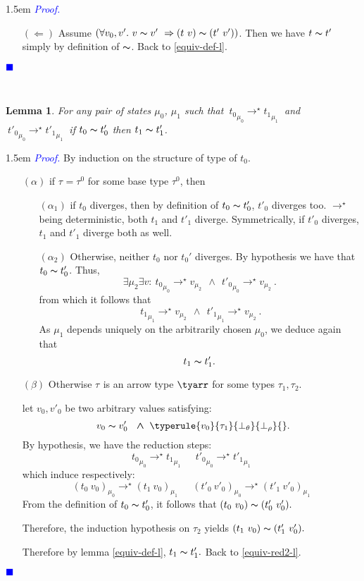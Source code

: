 \documentclass[a4paper,11pt,oneside]{article}
\theoremstyle{plain}
\newtheorem{lemma}[definition]{Lemma}
\renewenvironment{proof}{\noindent \begin{adjustwidth}{1.5em}{} \textcolor{blue}{\textit{Proof.}}}
{{\begin{tiny}\textcolor{blue}{$\blacksquare$}\end{tiny}}
\end{adjustwidth}~\\\noindent}
\newcommand{\tmapp}[2]{(#1 ~ #2)}
\newcommand{\ty}[1][]{\tau_{#1}}
\newcommand{\bwedge}{\boldsymbol{~\wedge~}}
\newcommand{\bth}{\bot_\theta}
\newcommand{\brh}{\bot_\rho}
\newcommand{\evalstar}[4]{~#1_{\mu_#2} \rightarrow^{\star} #3_{\mu_#4} ~}
\newcommand{\eqv}[1]{#1 \thicksim #1'}
\begin{document}
\begin{proof}
\begin{itemize}
	
		\item[$(\Leftarrow)$] Assume $(\forall v_0, v'.~\eqv{v}~\Rightarrow
		\tmapp{t}{v} \thicksim \tmapp{t'}{v'})$. 
		Then we have $\eqv{t}$ simply by definition of $\thicksim$. Back to \ref{equiv-def-l}.
				
		\end{itemize}	
	\end{proof}

	\begin{lemma}
		For any pair of states $\mu_0$, $\mu_1$ such that
		$\evalstar{{t_0}}{0}{{t_1}}{1}$ and $\evalstar{{t'_0}}{0}{{t'_1}}{1}$
		if $\eqv{t_0}$ then $\eqv{t_1}$.
		\label{equiv-red2-p}
	\end{lemma}
	
	\begin{proof}
		By induction on the structure of type of $t_0$. 
		\begin{itemize}
		\item[$(\alpha)$] if $\ty = \ty^0$ for some base type $\ty^0$, then
		
			\begin{itemize}
			\item[$(\alpha_1)$] if $t_0$ diverges, then by definition of 
			$\eqv{t_0}$, $t'_0$ diverges too. $\rightarrow^\star$ being 
			deterministic, both $t_1$ and $t'_1$ diverge. Symmetrically, if 
			$t'_0$ diverges, $t_1$ and $t'_1$ diverge both as well. 
						
			\item[$(\alpha_2)$] Otherwise, neither $t_0$ nor $t_{0}'$ diverges. 
			 By hypothesis we have that $\eqv{t_0}$. Thus,  
					$$ \exists \mu_2 \exists v: 
					\evalstar{{t_0}}{0}{v}{2} \bwedge \evalstar{{t'_0}}{0}{v}{2}.$$
				from which it follows that 
					$$\evalstar{{t_1}}{1}{v}{2} \bwedge \evalstar{{t'_1}}{1}{v}{2}.$$
				As $\mu_1$ depends uniquely on the arbitrarily chosen 
				$\mu_0$, we deduce again that $$\eqv{t_1}.$$					
			\end{itemize}			
			
		\item[$(\beta)$] Otherwise $\ty$ is an arrow type $\tyarr$ for some types 
		$\ty[1], \ty[2]$.	
		
		let $v_0, v'_0$ be two arbitrary values satisfying:
		$$~\eqv{v_0}~\bwedge \typerule{v_0}{\ty[1]}{\bth}{\brh}{}.$$
		By hypothesis, we have the reduction steps:
		$$\evalstar{{t_0}}{0}{{t_1}}{1}\quad\evalstar{{t'_0}}{0}{{t'_1}}{1}$$						which induce respectively: 
		$$\evalstar{\tmapp{t_0}{v_0}}{0}{\tmapp{t_1}{v_0}}{1} \quad
		\evalstar{\tmapp{t'_0}{v'_0}}{0}{\tmapp{t'_1}{v'_0}}{1}$$	
		From the definition of $\eqv{t_0}$, it follows that
		${\tmapp{t_0}{v_0}} \thicksim {\tmapp{t'_0}{v'_0}}.$
		
		Therefore, the induction hypothesis on $\ty[2]$ yields 
		${\tmapp{t_1}{v_0}}\thicksim{\tmapp{t'_1}{v'_0}}.$
		
		Therefore by lemma \ref{equiv-def-l},
		$\eqv{t_1}.$ Back to \ref{equiv-red2-l}.	
		\end{itemize}	
	\end{proof}		
	
\end{document}
